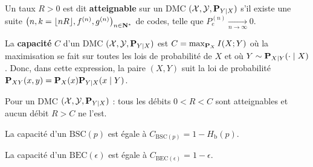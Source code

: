	\begin{defn}
		Un taux $R > 0$ est dit \textbf{atteignable} sur un DMC $(\mathcal{X},\mathcal{Y},\mathbf{P}_{Y \mid X})$ s'il existe une suite $\left( n,k = \lfloor nR \rfloor, f^{(n)}, g^{(n)} \right)_{n \in \mathbf{N}^*}$ de codes, telle que $P_e^{(n)} \underset{n \to \infty}{\longrightarrow} 0$.
	\end{defn}

	\begin{defn}
		La \textbf{capacité} $C$ d'un DMC $(\mathcal{X},\mathcal{Y},\mathbf{P}_{Y \mid X})$ est $C = \max_{\mathbf{P}_X} I(X;Y)$
		où la maximisation se fait sur toutes les lois de probabilité de $X$ et où $Y \sim \mathbf{P}_{X \mid Y}(\cdot \mid X)$.
		Donc, dans cette expression, la paire $(X,Y)$ suit la loi de probabilité $\mathbf{P}_{XY}(x,y) = \mathbf{P}_X(x) \mathbf{P}_{Y \mid X}(x \mid Y)$.
	\end{defn}

	\begin{thm}
		Pour un DMC $(\mathcal{X},\mathcal{Y},\mathbf{P}_{Y \mid X})$ : tous les débits $0 < R < C$ sont atteignables et aucun débit $R > C$ ne l'est.
	\end{thm}

	\begin{pop}
		La capacité d'un $\mathrm{BSC}(p)$ est égale à $C_{\mathrm{BSC}(p)} = 1 - H_{\mathrm{b}}(p)$.
	\end{pop}

	\begin{pop}
		La capacité d'un $\mathrm{BEC}(\epsilon)$ est égale à $C_{\mathrm{BEC}(\epsilon)} = 1 - \epsilon$.
	\end{pop}